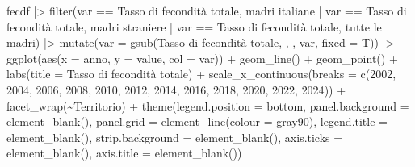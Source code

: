 \documentclass[
]{article}
\newenvironment{Shaded}{\begin{snugshade}}{\end{snugshade}}
\newcommand{\AttributeTok}[1]{\textcolor[rgb]{0.40,0.45,0.13}{#1}}
\newcommand{\DecValTok}[1]{\textcolor[rgb]{0.68,0.00,0.00}{#1}}
\newcommand{\FunctionTok}[1]{\textcolor[rgb]{0.28,0.35,0.67}{#1}}
\newcommand{\NormalTok}[1]{\textcolor[rgb]{0.00,0.23,0.31}{#1}}
\newcommand{\SpecialCharTok}[1]{\textcolor[rgb]{0.37,0.37,0.37}{#1}}
\newcommand{\StringTok}[1]{\textcolor[rgb]{0.13,0.47,0.30}{#1}}
\begin{document}
\begin{Shaded}
\begin{Highlighting}[]
\NormalTok{fecdf }\SpecialCharTok{|\textgreater{}} 
  \FunctionTok{filter}\NormalTok{(var }\SpecialCharTok{==} \StringTok{\textquotesingle{}Tasso di fecondità totale, madri italiane\textquotesingle{}}
         \SpecialCharTok{|}\NormalTok{ var }\SpecialCharTok{==} \StringTok{\textquotesingle{}Tasso di fecondità totale, madri straniere\textquotesingle{}}
         \SpecialCharTok{|}\NormalTok{ var }\SpecialCharTok{==} \StringTok{\textquotesingle{}Tasso di fecondità totale, tutte le madri\textquotesingle{}}\NormalTok{) }\SpecialCharTok{|\textgreater{}} 
  \FunctionTok{mutate}\NormalTok{(}\AttributeTok{var =} \FunctionTok{gsub}\NormalTok{(}\StringTok{\textquotesingle{}Tasso di fecondità totale, \textquotesingle{}}\NormalTok{, }\StringTok{\textquotesingle{}\textquotesingle{}}\NormalTok{, var, }\AttributeTok{fixed =}\NormalTok{ T)) }\SpecialCharTok{|\textgreater{}} 
  \FunctionTok{ggplot}\NormalTok{(}\FunctionTok{aes}\NormalTok{(}\AttributeTok{x =}\NormalTok{ anno, }\AttributeTok{y =}\NormalTok{ value, }\AttributeTok{col =}\NormalTok{ var)) }\SpecialCharTok{+}
  \FunctionTok{geom\_line}\NormalTok{() }\SpecialCharTok{+}
  \FunctionTok{geom\_point}\NormalTok{() }\SpecialCharTok{+}
  \FunctionTok{labs}\NormalTok{(}\AttributeTok{title =} \StringTok{\textquotesingle{}Tasso di fecondità totale\textquotesingle{}}\NormalTok{) }\SpecialCharTok{+}
  \FunctionTok{scale\_x\_continuous}\NormalTok{(}\AttributeTok{breaks =} \FunctionTok{c}\NormalTok{(}\DecValTok{2002}\NormalTok{, }\DecValTok{2004}\NormalTok{, }\DecValTok{2006}\NormalTok{, }\DecValTok{2008}\NormalTok{, }\DecValTok{2010}\NormalTok{, }\DecValTok{2012}\NormalTok{, }\DecValTok{2014}\NormalTok{, }\DecValTok{2016}\NormalTok{, }\DecValTok{2018}\NormalTok{, }\DecValTok{2020}\NormalTok{, }\DecValTok{2022}\NormalTok{, }\DecValTok{2024}\NormalTok{)) }\SpecialCharTok{+}
  \FunctionTok{facet\_wrap}\NormalTok{(}\SpecialCharTok{\textasciitilde{}}\NormalTok{Territorio) }\SpecialCharTok{+}
  \FunctionTok{theme}\NormalTok{(}\AttributeTok{legend.position =} \StringTok{\textquotesingle{}bottom\textquotesingle{}}\NormalTok{,}
        \AttributeTok{panel.background =} \FunctionTok{element\_blank}\NormalTok{(),}
        \AttributeTok{panel.grid =} \FunctionTok{element\_line}\NormalTok{(}\AttributeTok{colour =} \StringTok{\textquotesingle{}gray90\textquotesingle{}}\NormalTok{),}
        \AttributeTok{legend.title =} \FunctionTok{element\_blank}\NormalTok{(),}
        \AttributeTok{strip.background =} \FunctionTok{element\_blank}\NormalTok{(),}
        \AttributeTok{axis.ticks =} \FunctionTok{element\_blank}\NormalTok{(),}
        \AttributeTok{axis.title =} \FunctionTok{element\_blank}\NormalTok{())}
\end{Highlighting}
\end{Shaded}
\end{document}
